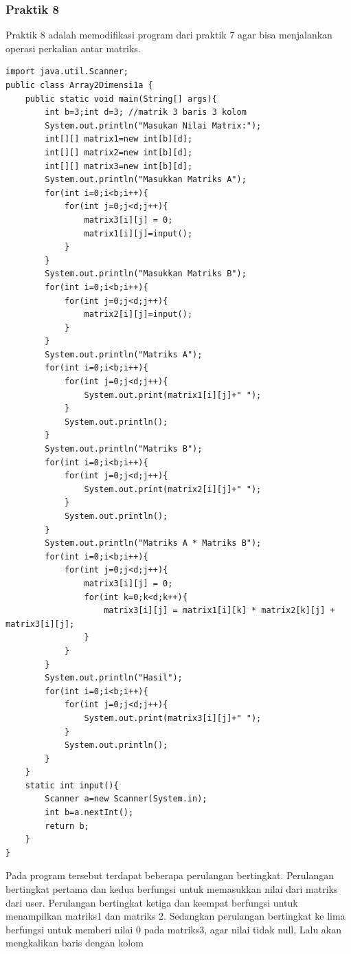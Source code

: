 \documentclass[a4paper,12pt]{article}
\begin{document}
\subsubsection{Praktik 8}
Praktik 8 adalah memodifikasi program dari praktik 7 agar bisa menjalankan operasi perkalian antar matriks.
\begin{lstlisting}
import java.util.Scanner;
public class Array2Dimensi1a {
    public static void main(String[] args){
        int b=3;int d=3; //matrik 3 baris 3 kolom
        System.out.println("Masukan Nilai Matrix:");
        int[][] matrix1=new int[b][d];
        int[][] matrix2=new int[b][d];
        int[][] matrix3=new int[b][d];
        System.out.println("Masukkan Matriks A");
        for(int i=0;i<b;i++){
            for(int j=0;j<d;j++){
                matrix3[i][j] = 0;
                matrix1[i][j]=input();
            }
        }
        System.out.println("Masukkan Matriks B");
        for(int i=0;i<b;i++){
            for(int j=0;j<d;j++){
                matrix2[i][j]=input();
            }
        }
        System.out.println("Matriks A");
        for(int i=0;i<b;i++){
            for(int j=0;j<d;j++){
                System.out.print(matrix1[i][j]+" ");
            }
            System.out.println();
        }
        System.out.println("Matriks B");
        for(int i=0;i<b;i++){
            for(int j=0;j<d;j++){
                System.out.print(matrix2[i][j]+" ");
            }
            System.out.println();
        }
        System.out.println("Matriks A * Matriks B");
        for(int i=0;i<b;i++){
            for(int j=0;j<d;j++){
                matrix3[i][j] = 0;
                for(int k=0;k<d;k++){
                    matrix3[i][j] = matrix1[i][k] * matrix2[k][j] + matrix3[i][j];
                }
            }
        }
        System.out.println("Hasil");
        for(int i=0;i<b;i++){
            for(int j=0;j<d;j++){
                System.out.print(matrix3[i][j]+" ");
            }
            System.out.println();
        }
    }
    static int input(){
        Scanner a=new Scanner(System.in);
        int b=a.nextInt();
        return b;
    }
}
\end{lstlisting}
Pada program tersebut terdapat beberapa perulangan bertingkat. Perulangan bertingkat pertama dan kedua berfungsi untuk memasukkan nilai dari matriks dari user. Perulangan bertingkat ketiga dan keempat berfungsi
untuk menampilkan matriks1 dan matriks 2. Sedangkan perulangan bertingkat ke lima berfungsi untuk memberi nilai 0 pada matriks3, agar nilai tidak null, Lalu akan mengkalikan baris dengan kolom 
\end{document}
